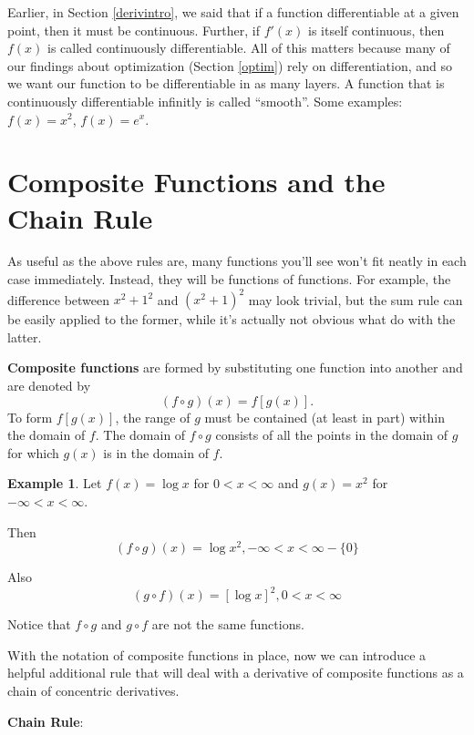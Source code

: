 \documentclass[
]{book}
\theoremstyle{definition}
\theoremstyle{definition}
\newtheorem{example}{Example}[chapter]
\theoremstyle{definition}
\theoremstyle{remark}
\begin{document}
Earlier, in Section \ref{derivintro}, we said that if a function differentiable at a given point, then it must be continuous. Further, if \(f'(x)\) is itself continuous, then \(f(x)\) is called continuously differentiable. All of this matters because many of our findings about optimization (Section \ref{optim}) rely on differentiation, and so we want our function to be differentiable in as many layers. A function that is continuously differentiable infinitly is called ``smooth''. Some examples: \(f(x) = x^2\), \(f(x) = e^x\).

\hypertarget{composite-functions-and-the-chain-rule}{%
\section{Composite Functions and the Chain Rule}\label{composite-functions-and-the-chain-rule}}

As useful as the above rules are, many functions you'll see won't fit neatly in each case immediately. Instead, they will be functions of functions. For example, the difference between \(x^2 + 1^2\) and \((x^2 + 1)^2\) may look trivial, but the sum rule can be easily applied to the former, while it's actually not obvious what do with the latter.

\textbf{Composite functions} are formed by substituting one function into another and are denoted by \[(f\circ g)(x)=f[g(x)].\] To form \(f[g(x)]\), the range of \(g\) must be contained (at least in part) within the domain of \(f\). The domain of \(f\circ g\) consists of all the points in the domain of \(g\) for which \(g(x)\) is in the domain of \(f\).

\begin{example}
\protect\hypertarget{exm:unnamed-chunk-17}{}{\label{exm:unnamed-chunk-17} }Let \(f(x)=\log x\) for \(0<x<\infty\) and \(g(x)=x^2\) for \(-\infty<x<\infty\).

Then
\[(f\circ g)(x)=\log x^2, -\infty<x<\infty - \{0\}\]

Also
\[(g\circ f)(x)=[\log x]^2, 0<x<\infty\]

Notice that \(f\circ g\) and \(g\circ f\) are not the same functions.
\end{example}

With the notation of composite functions in place, now we can introduce a helpful additional rule that will deal with a derivative of composite functions as a chain of concentric derivatives.

\textbf{Chain Rule}:
\end{document}
